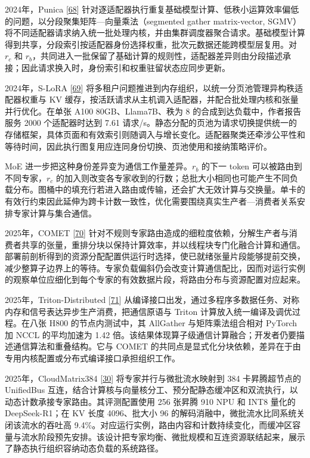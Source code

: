 \documentclass[UTF8,10.5pt,fontset=windows]{ctexart}
\begin{document}
2024年，Punica {[}\protect\hyperlink{ref-chen2024punica}{68}{]}
针对逐适配器执行重复基础模型计算、低秩小运算效率偏低的问题，以分段聚集矩阵---向量乘法（segmented
gather matrix-vector,
SGMV）将不同适配器请求纳入统一批处理内核，并由集群调度器聚合请求。基础模型计算得到共享，分段索引按适配器身份选择权重，批次元数据还能跨模型层复用。对
\(r_c\) 和
\(r_b\)，共同进入一批保留了基础计算的规则性，适配器差异则由分段描述承接；因此请求换入时，身份索引和权重驻留状态应同步更新。

2024年，S-LoRA {[}\protect\hyperlink{ref-sheng2024slora}{69}{]}
将多租户问题推进到内存组织，以统一分页池管理异构秩适配器权重与 KV
缓存，按活跃请求从主机调入适配器，并配合批处理内核和张量并行优化。在单张
A100 80GB、Llama7B、秩为 8 的合成到达负载中，作者报告服务 2000
个适配器时达到 7.61
请求/s。静态分配的页池为请求切换提供统一的存储框架，具体页面和有效索引则随调入与增长变化。适配器聚类还牵涉公平性和等待时间，因此执行图复用应连同身份切换、页池使用和接纳策略评价。

MoE 进一步把这种身份差异变为通信工作量差异。\(r_b\) 的下一 token
可以被路由到不同专家，\(r_c\)
的加入则改变各专家收到的行数；总批大小相同也可能产生不同负载分布。图桶中的填充行若进入路由或传输，还会扩大无效计算与交换量。单卡的有效行约束因此延伸为跨卡计数一致性，优化需要围绕真实生产者---消费者关系安排专家计算与集合通信。

2025年，COMET {[}\protect\hyperlink{ref-zhang2025comet}{70}{]}
针对不规则专家路由造成的细粒度依赖，分解生产者与消费者共享的张量，重排分块以保持计算效率，并以线程块专门化融合计算和通信。部署前剖析得到的资源分配配置供运行时选择，使已就绪张量片段能够提前交换，减少整算子边界上的等待。专家负载偏斜仍会改变计算通信配比，因而对运行实例的观察单位应细化到每个专家的有效数据片段，将路由分布与资源配置对应起来。

2025年，Triton-Distributed
{[}\protect\hyperlink{ref-zheng2025tritondist}{71}{]}
从编译接口出发，通过多程序多数据任务、对称内存和信号表达异步生产消费，把通信原语与
Triton 计算放入统一编译及调优过程。在八张 H800 的节点内测试中，其
AllGather 与矩阵乘法组合相对 PyTorch 加 NCCL 的平均加速为 1.42
倍。该结果体现算子级通信计算融合；开发者仍要描述通信算法和重叠结构。它与
COMET
的共同点是显式化分块依赖，差异在于由专用内核配置或分布式编译接口承担组织工作。

2025年，CloudMatrix384
{[}\protect\hyperlink{ref-zuo2025cloudmatrix384}{30}{]}
将专家并行与微批流水映射到 384 卡昇腾超节点的 UnifiedBus
互连，结合计算核与向量核分工、预分配静态缓冲区和双流执行，以动态计数承接专家路由。其评测配置使用
256 张昇腾 910 NPU 和 INT8 量化的 DeepSeek-R1；在 KV 长度 4096、批大小
96 的解码消融中，微批流水比同系统关闭该流水的吞吐高
9.4\%。对应运行实例，路由内容和计数持续变化，而缓冲区容量与流水阶段预先安排。该设计把专家均衡、微批规模和互连资源联结起来，展示了静态执行组织容纳动态负载的系统路径。
\end{document}
